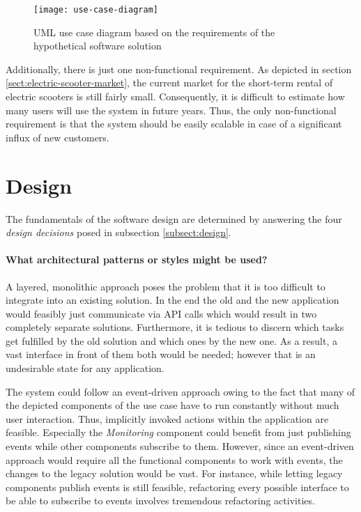 \documentclass[12pt,a4paper]{report}
\begin{document}
\begin{figure}[htbp]
\centering
\texttt{[image: use-case-diagram]}
\caption{UML use case diagram based on the requirements of the hypothetical software solution}
\label{fig:use-case-diagram}
\end{figure}

Additionally, there is just one non-functional requirement.
As depicted in section \ref{sect:electric-scooter-market}, the current market
for the short-term rental of electric scooters is still fairly small.
Consequently, it is difficult to estimate how many users will use the system
in future years. Thus, the only non-functional requirement is that the system
should be easily scalable in case of a significant influx of new customers.


\section{Design}

The fundamentals of the software design are determined by answering the four
\textit{design decisions} posed in subsection \ref{subsect:design}.

\paragraph{What architectural patterns or styles might be used?}
A layered, monolithic approach poses the problem that it is too difficult
to integrate into an existing solution. In the end the old and the new
application would feasibly just communicate via API calls which would result
in two completely separate solutions. Furthermore, it is tedious to discern
which tasks get fulfilled by the old solution and which ones by the new one.
As a result, a vast interface in front of them both would be needed;
however that is an undesirable state for any application.

The system could follow an event-driven approach owing to the fact that
many of the depicted components of the use case have to run constantly without
much user interaction. Thus, implicitly invoked actions within the application
are feasible. Especially the \textit{Monitoring} component could benefit from
just publishing events while other components subscribe to them.
However, since an event-driven approach would require all the
functional components to work with events, the changes to the legacy solution
would be vast. For instance, while letting legacy components publish events
is still feasible, refactoring every possible interface to be able
to subscribe to events involves tremendous refactoring activities.
\end{document}
